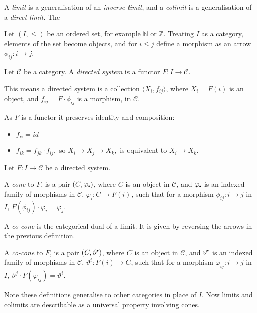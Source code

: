     
    A \emph{limit} is a generalisation of an \emph{inverse limit}, and a \emph{colimit} is a generalisation of a \emph{direct limit}. The 
    
    Let \( (I, \leq)\) be an ordered set, for example \( \mathbb{N} \) or \( \mathbb{Z}\). Treating \(I\) as a category, elements of the set become objects, and for \( i \leq j\) define a  morphism as an arrow \( \phi_{ij} : i \rightarrow j\).
    
    \begin{defn}
    Let  \(\mathcal{C}\) be a category. A \emph{directed system} is a functor \( F : I \rightarrow \mathcal{C}\).
    \end{defn}
    
    This means a directed system is a collection 
    \( \langle X_i, f_{ij}\rangle\),
    where \(X_i =F(i)\) is an object, and \(f_{ij} = F \cdot \phi_{ij} \) is a morphism, in \( \mathcal{C}\). 
    
    As \(F\) is a functor it preserves identity and composition:
    \begin{itemize}
    \item \( f_{ii} = id\)
    \item \( f_{ik} = f_{jk} \cdot f_{ij},\)
    so
    \( X_i \rightarrow X_j \rightarrow X_k, \)
    is equivalent to
    \( X_i \rightarrow X_k\).
    \end{itemize}

    Let \( F : I \rightarrow \mathcal{C}\) be a directed system.
    
    \begin{defn}[Cone]
    A \emph{cone} to \(F\), is a pair \( (C, \varphi_{\sbt})\), where \(C\) is an object in \(\mathcal{C}\), and \( \varphi_{\sbt}\) is an indexed family of morphisms in \( \mathcal{C}\), 
    \(  \varphi_i : C \rightarrow F(i)\),
    such that for a morphism 
    \( \phi_{ij} : i \rightarrow j\) in \(I\), 
    \( F(\phi_{ij}) \cdot \varphi_i = \varphi_j. \) 
    \end{defn}
    A \emph{co-cone} is the categorical dual of a limit. It is given by reversing the arrows in the previous definition.
    \begin{defn}[Co-cone]
    A \emph{co-cone} to \(F\), is a pair \((C, \vartheta^{\sbt})\), where \(C \) is an object in \( \mathcal{C}\), and  \(\vartheta^{\sbt}\) is an indexed family of morphisms in \( \mathcal{C}\),  \( \vartheta^{i} : F(i) \rightarrow C\), such that for a morphism \( \varphi_{ij} : i \rightarrow j \) in \(I\), 
    \( \vartheta^j \cdot  F(\varphi_{ij}) = \vartheta^i. \)
    \end{defn}
    Note these definitions generalise to other categories in place of \(I\). Now limits and colimits are describable as a universal property involving cones.
    
